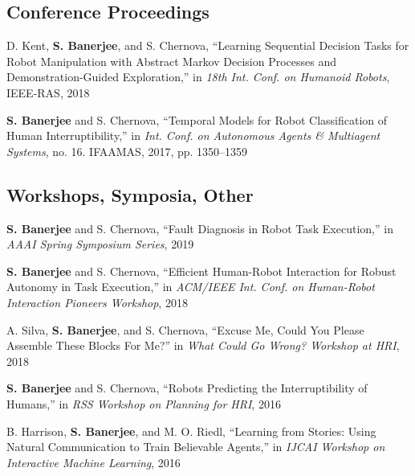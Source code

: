 \documentclass[letterpaper]{article}
\renewenvironment{itemize}{
  \begin{list}{}{
    \setlength{\leftmargin}{1.5em}
  }
}{
  \end{list}
}
\begin{document}
\subsection*{Conference Proceedings}

\begin{itemize}
  \item D. Kent, \textbf{S. Banerjee}, and S. Chernova, ``Learning Sequential Decision Tasks for Robot Manipulation with Abstract Markov Decision Processes and Demonstration-Guided Exploration,'' in \textit{18th Int. Conf. on Humanoid Robots}, IEEE-RAS, 2018

  \item \textbf{S. Banerjee} and S. Chernova, ``Temporal Models for Robot Classification of Human Interruptibility,'' in \textit{Int. Conf. on Autonomous Agents \& Multiagent Systems}, no. 16. IFAAMAS, 2017, pp. 1350--1359
\end{itemize}

\subsection*{Workshops, Symposia, Other}

\begin{itemize}
  \item \textbf{S. Banerjee} and S. Chernova, ``Fault Diagnosis in Robot Task Execution,'' in \textit{AAAI Spring Symposium Series}, 2019

  \item \textbf{S. Banerjee} and S. Chernova, ``Efficient Human-Robot Interaction for Robust Autonomy in Task Execution,'' in \textit{ACM/IEEE Int. Conf. on Human-Robot Interaction Pioneers Workshop}, 2018

  \item A. Silva, \textbf{S. Banerjee}, and S. Chernova, ``Excuse Me, Could You Please Assemble These Blocks For Me?'' in \textit{What Could Go Wrong? Workshop at HRI}, 2018

  \item \textbf{S. Banerjee} and S. Chernova, ``Robots Predicting the Interruptibility of Humans,'' in \textit{RSS Workshop on Planning for HRI}, 2016

  \item B. Harrison, \textbf{S. Banerjee}, and M. O. Riedl, ``Learning from Stories: Using Natural Communication to Train Believable Agents,'' in \textit{IJCAI Workshop on Interactive Machine Learning}, 2016
\end{itemize}
\end{document}

